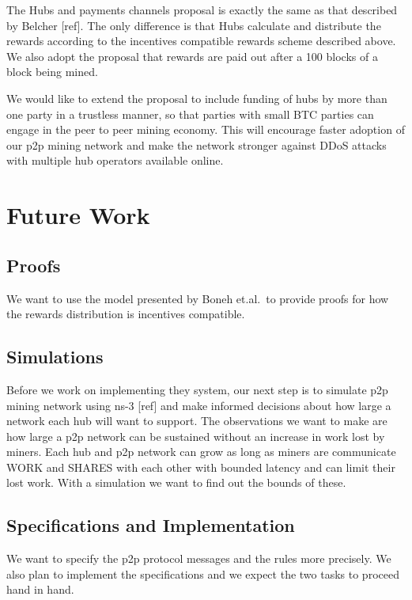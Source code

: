 \documentclass{article}
\begin{document}
The Hubs and payments channels proposal is exactly the same as that
described by Belcher [ref]. The only difference is that Hubs calculate
and distribute the rewards according to the incentives compatible
rewards scheme described above. We also adopt the proposal that
rewards are paid out after a 100 blocks of a block being mined.

We would like to extend the proposal to include funding of hubs by
more than one party in a trustless manner, so that parties with small
BTC parties can engage in the peer to peer mining economy. This will
encourage faster adoption of our p2p mining network and make the
network stronger against DDoS attacks with multiple hub operators
available online.




   

\section{Future Work}

\subsection{Proofs}

We want to use the model presented by Boneh et.al.\ to provide proofs
for how the rewards distribution is incentives compatible.

\subsection{Simulations}
Before we work on implementing they system, our next step is to
simulate p2p mining network using ns-3 [ref] and make informed
decisions about how large a network each hub will want to support. The
observations we want to make are how large a p2p network can be
sustained without an increase in work lost by miners. Each hub and p2p
network can grow as long as miners are communicate WORK and SHARES
with each other with bounded latency and can limit their lost
work. With a simulation we want to find out the bounds of these.

\subsection{Specifications and Implementation}

We want to specify the p2p protocol messages and the rules more
precisely. We also plan to implement the specifications and we expect
the two tasks to proceed hand in hand.
\end{document}
